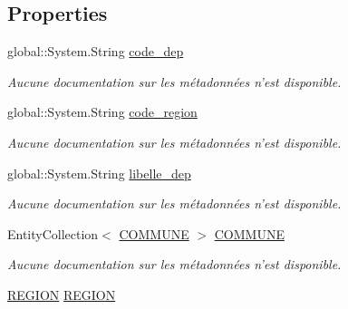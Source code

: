 \subsection*{Properties}
\begin{DoxyCompactItemize}
\item 
global\-::\-System.\-String \hyperlink{class_model_1_1_d_e_p_a_r_t_e_m_e_n_t_a2f34735310ea76c3f5b6cf158b85c314}{code\-\_\-dep}
\begin{DoxyCompactList}\small\item\em Aucune documentation sur les métadonnées n'est disponible. \end{DoxyCompactList}\item 
global\-::\-System.\-String \hyperlink{class_model_1_1_d_e_p_a_r_t_e_m_e_n_t_ab0e3826fb790a948c808c7ecabd4e2f9}{code\-\_\-region}
\begin{DoxyCompactList}\small\item\em Aucune documentation sur les métadonnées n'est disponible. \end{DoxyCompactList}\item 
global\-::\-System.\-String \hyperlink{class_model_1_1_d_e_p_a_r_t_e_m_e_n_t_aa1736783b4b382723941604c85f83a3f}{libelle\-\_\-dep}
\begin{DoxyCompactList}\small\item\em Aucune documentation sur les métadonnées n'est disponible. \end{DoxyCompactList}\item 
Entity\-Collection$<$ \hyperlink{class_model_1_1_c_o_m_m_u_n_e}{C\-O\-M\-M\-U\-N\-E} $>$ \hyperlink{class_model_1_1_d_e_p_a_r_t_e_m_e_n_t_a358ff1c2c8c59dcde2585fe932beac03}{C\-O\-M\-M\-U\-N\-E}
\begin{DoxyCompactList}\small\item\em Aucune documentation sur les métadonnées n'est disponible. \end{DoxyCompactList}\item 
\hyperlink{class_model_1_1_r_e_g_i_o_n}{R\-E\-G\-I\-O\-N} \hyperlink{class_model_1_1_d_e_p_a_r_t_e_m_e_n_t_ab192797eea7cee21e42260494cce825a}{R\-E\-G\-I\-O\-N}

\end{DoxyCompactItemize}
